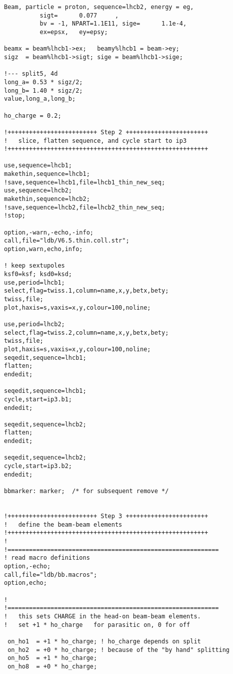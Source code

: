 \begin{verbatim}
Beam, particle = proton, sequence=lhcb2, energy = eg,
          sigt=      0.077     , 
          bv = -1, NPART=1.1E11, sige=      1.1e-4, 
          ex=epsx,   ey=epsy;

beamx = beam%lhcb1->ex;   beamy%lhcb1 = beam->ey;
sigz  = beam%lhcb1->sigt; sige = beam%lhcb1->sige;

!--- split5, 4d
long_a= 0.53 * sigz/2;
long_b= 1.40 * sigz/2;
value,long_a,long_b;

ho_charge = 0.2;

!+++++++++++++++++++++++++ Step 2 +++++++++++++++++++++++
! 	slice, flatten sequence, and cycle start to ip3
!++++++++++++++++++++++++++++++++++++++++++++++++++++++++

use,sequence=lhcb1;
makethin,sequence=lhcb1;
!save,sequence=lhcb1,file=lhcb1_thin_new_seq;
use,sequence=lhcb2;
makethin,sequence=lhcb2;
!save,sequence=lhcb2,file=lhcb2_thin_new_seq;
!stop;

option,-warn,-echo,-info;
call,file="ldb/V6.5.thin.coll.str";
option,warn,echo,info;

! keep sextupoles
ksf0=ksf; ksd0=ksd;
use,period=lhcb1;
select,flag=twiss.1,column=name,x,y,betx,bety;
twiss,file;
plot,haxis=s,vaxis=x,y,colour=100,noline;

use,period=lhcb2;
select,flag=twiss.2,column=name,x,y,betx,bety;
twiss,file;
plot,haxis=s,vaxis=x,y,colour=100,noline;
seqedit,sequence=lhcb1;
flatten;
endedit;

seqedit,sequence=lhcb1;
cycle,start=ip3.b1;
endedit;

seqedit,sequence=lhcb2;
flatten;
endedit;

seqedit,sequence=lhcb2;
cycle,start=ip3.b2;
endedit;

bbmarker: marker;  /* for subsequent remove */


!+++++++++++++++++++++++++ Step 3 +++++++++++++++++++++++
! 	define the beam-beam elements
!++++++++++++++++++++++++++++++++++++++++++++++++++++++++
!
!===========================================================
! read macro definitions
option,-echo;
call,file="ldb/bb.macros";
option,echo;

!
!===========================================================
!   this sets CHARGE in the head-on beam-beam elements. 
!   set +1 * ho_charge   for parasitic on, 0 for off

 on_ho1  = +1 * ho_charge; ! ho_charge depends on split
 on_ho2  = +0 * ho_charge; ! because of the "by hand" splitting
 on_ho5  = +1 * ho_charge;
 on_ho8  = +0 * ho_charge;


\end{verbatim}
